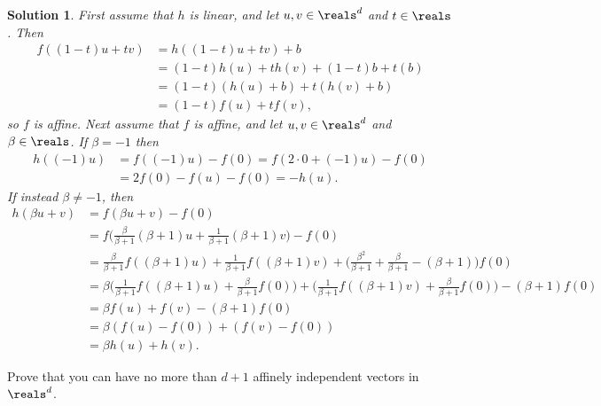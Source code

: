 \documentclass[article, a4paper, 11pt, oneside]{memoir}
\numberwithin{equation}{chapter}
\theoremstyle{nonumberplain}
\newtheorem{solution}{Solution}
\begin{document}
\begin{solution}
    First assume that $h$ is linear, and let $u,v \in \reals^d$ and $t \in \reals$. Then
    \begin{align*}
        f((1-t)u + tv)
            &= h((1-t)u + tv) + b \\
            &= (1-t)h(u) + th(v) + (1-t)b + t(b) \\
            &= (1-t)(h(u) + b) + t(h(v) + b) \\
            &= (1-t)f(u) + tf(v),
    \end{align*}
    so $f$ is affine. Next assume that $f$ is affine, and let $u,v \in \reals^d$ and $\beta \in \reals$. If $\beta = -1$ then
    \begin{align*}
        h((-1)u)
            &= f((-1)u) - f(0)
             = f(2 \cdot 0 + (-1)u) - f(0) \\
            &= 2f(0) - f(u) - f(0)
             = -h(u).
    \end{align*}
    If instead $\beta \neq -1$, then
    \begin{align*}
        h(\beta u + v)
            &= f(\beta u + v) - f(0) \\
            &= f \bigl(
                    \tfrac{\beta}{\beta+1} (\beta+1)u
                    + \tfrac{1}{\beta+1} (\beta+1)v
                \bigr)
                - f(0) \\
            &= \tfrac{\beta}{\beta+1} f((\beta+1)u)
                + \tfrac{1}{\beta+1} f((\beta+1)v)
                + \bigl(
                    \tfrac{\beta^2}{\beta+1}
                    + \tfrac{\beta}{\beta+1}
                    - (\beta+1)
                \bigr) f(0) \\
            &= \beta \bigl( 
                    \tfrac{1}{\beta+1} f((\beta+1)u)
                    + \tfrac{\beta}{\beta+1} f(0)
                \bigr)
                    + \bigl( \tfrac{1}{\beta+1} f((\beta+1)v)
                    + \tfrac{\beta}{\beta+1} f(0)
                \bigr)
                - (\beta+1)f(0) \\
            &= \beta f(u) + f(v) - (\beta+1) f(0) \\
            &= \beta (f(u) - f(0)) + (f(v) - f(0)) \\
            &= \beta h(u) + h(v).
    \end{align*}
\end{solution}


\begin{exerciseframed*}[10]
    Prove that you can have no more than $d+1$ affinely independent vectors in $\reals^d$.
\end{exerciseframed*}
\end{document}
